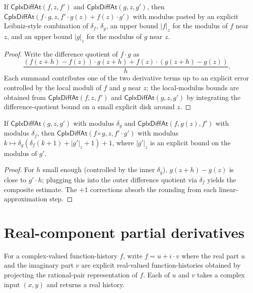 \begin{lemma}
\label{lem:cplx-diff-product}
If \(\mathsf{CplxDiffAt}(f, z, f')\) and \(\mathsf{CplxDiffAt}(g, z, g')\), then \(\mathsf{CplxDiffAt}(f \cdot g, z, f' \cdot g(z) + f(z) \cdot g')\) with modulus pasted by an explicit Leibniz-style combination of \(\delta_f\), \(\delta_g\), an upper bound \(|f|_z\) for the modulus of \(f\) near \(z\), and an upper bound \(|g|_z\) for the modulus of \(g\) near \(z\).
\end{lemma}
\begin{proof}
Write the difference quotient of \(f \cdot g\) as
$$
\frac{(f(z+h) - f(z)) \cdot g(z+h) + f(z) \cdot (g(z+h) - g(z))}{h}.
$$
Each summand contributes one of the two derivative terms up to an explicit error controlled by the local moduli of \(f\) and \(g\) near \(z\); the local-modulus bounds are obtained from \(\mathsf{CplxDiffAt}(f, z, f')\) and \(\mathsf{CplxDiffAt}(g, z, g')\) by integrating the difference-quotient bound on a small explicit disk around \(z\).
\end{proof}

\begin{lemma}
\label{lem:cplx-diff-chain}
If \(\mathsf{CplxDiffAt}(g, z, g')\) with modulus \(\delta_g\) and \(\mathsf{CplxDiffAt}(f, g(z), f')\) with modulus \(\delta_f\), then \(\mathsf{CplxDiffAt}(f \circ g, z, f' \cdot g')\) with modulus \(k \mapsto \delta_g(\delta_f(k+1) + |g'|_z + 1) + 1\), where \(|g'|_z\) is an explicit bound on the modulus of \(g'\).
\end{lemma}
\begin{proof}
For \(h\) small enough (controlled by the inner \(\delta_g\)), \(g(z+h) - g(z)\) is close to \(g' \cdot h\); plugging this into the outer difference quotient via \(\delta_f\) yields the composite estimate. The \(+1\) corrections absorb the rounding from each linear-approximation step.
\end{proof}

\section{Real-component partial derivatives}

\begin{definition}
\label{def:cplx-real-proj}
For a complex-valued function-history \(f\), write \(f = u + i \cdot v\) where the real part \(u\) and the imaginary part \(v\) are explicit real-valued function-histories obtained by projecting the rational-pair representation of \(f\). Each of \(u\) and \(v\) takes a complex input \((x, y)\) and returns a real history.
\end{definition}

